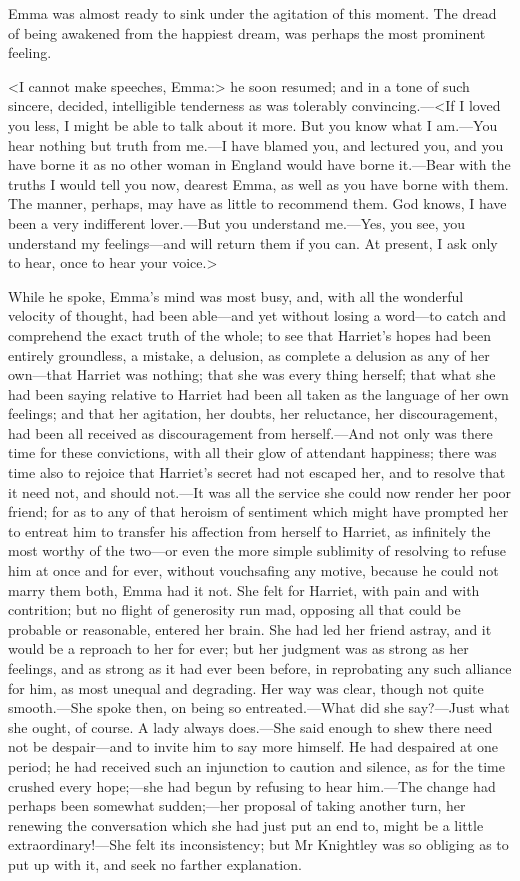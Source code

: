 Emma was almost ready to sink under the agitation of this moment. The dread of being awakened from the happiest dream, was perhaps the most prominent feeling.

<I cannot make speeches, Emma:> he soon resumed; and in a tone of such sincere, decided, intelligible tenderness as was tolerably convincing.—<If I loved you less, I might be able to talk about it more. But you know what I am.—You hear nothing but truth from me.—I have blamed you, and lectured you, and you have borne it as no other woman in England would have borne it.—Bear with the truths I would tell you now, dearest Emma, as well as you have borne with them. The manner, perhaps, may have as little to recommend them. God knows, I have been a very indifferent lover.—But you understand me.—Yes, you see, you understand my feelings—and will return them if you can. At present, I ask only to hear, once to hear your voice.>

While he spoke, Emma's mind was most busy, and, with all the wonderful velocity of thought, had been able—and yet without losing a word—to catch and comprehend the exact truth of the whole; to see that Harriet's hopes had been entirely groundless, a mistake, a delusion, as complete a delusion as any of her own—that Harriet was nothing; that she was every thing herself; that what she had been saying relative to Harriet had been all taken as the language of her own feelings; and that her agitation, her doubts, her reluctance, her discouragement, had been all received as discouragement from herself.—And not only was there time for these convictions, with all their glow of attendant happiness; there was time also to rejoice that Harriet's secret had not escaped her, and to resolve that it need not, and should not.—It was all the service she could now render her poor friend; for as to any of that heroism of sentiment which might have prompted her to entreat him to transfer his affection from herself to Harriet, as infinitely the most worthy of the two—or even the more simple sublimity of resolving to refuse him at once and for ever, without vouchsafing any motive, because he could not marry them both, Emma had it not. She felt for Harriet, with pain and with contrition; but no flight of generosity run mad, opposing all that could be probable or reasonable, entered her brain. She had led her friend astray, and it would be a reproach to her for ever; but her judgment was as strong as her feelings, and as strong as it had ever been before, in reprobating any such alliance for him, as most unequal and degrading. Her way was clear, though not quite smooth.—She spoke then, on being so entreated.—What did she say?—Just what she ought, of course. A lady always does.—She said enough to shew there need not be despair—and to invite him to say more himself. He had despaired at one period; he had received such an injunction to caution and silence, as for the time crushed every hope;—she had begun by refusing to hear him.—The change had perhaps been somewhat sudden;—her proposal of taking another turn, her renewing the conversation which she had just put an end to, might be a little extraordinary!—She felt its inconsistency; but Mr Knightley was so obliging as to put up with it, and seek no farther explanation.


